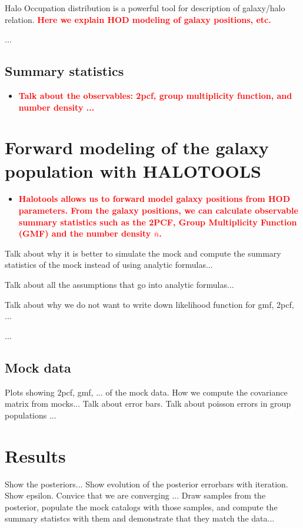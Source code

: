 \documentclass[12pt, preprint]{aastex}
\newcommand{\todo}[1]{{\bf \textcolor{red}{ #1}}}
\begin{document}
Halo Occupation distribution is a powerful tool for description of galaxy/halo relation. \todo{Here we explain HOD modeling of galaxy positions, etc.}

...

\subsection{Summary statistics}
\begin{itemize}

\item \todo{Talk about the observables: 2pcf, group multiplicity function, and number density ...}

\end{itemize}

\section{Forward modeling of the galaxy population with HALOTOOLS}\label{sec:halo}

\begin{itemize}
\item \todo{Halotools allows us to forward model galaxy positions from HOD parameters. From the galaxy positions, we can calculate observable summary statistics such as the 2PCF, Group Multiplicity Function (GMF) and the number density $\bar{n}$.}

\end{itemize}
Talk about why it is better to simulate the mock and compute the summary statistics of the mock instead of 
using analytic formulas...

Talk about all the assumptions that go into analytic formulas...

Talk about why we do not want to write down likelihood function for gmf, 2pcf, ...

...


\subsection{Mock data}
Plots showing 2pcf, gmf, ... of the mock data.
How we compute the covariance matrix from mocks...
Talk about error bars. Talk about poisson errors in group populations ... 

\section{Results}\label{sec:results}
Show the posteriors...
Show evolution of the posterior errorbars with iteration. Show epsilon. Convice that we are converging ...
Draw samples from the posterior, populate the mock catalogs with those samples, and compute the summary statistcs with them 
and demonstrate that they match the data...
\end{document}
